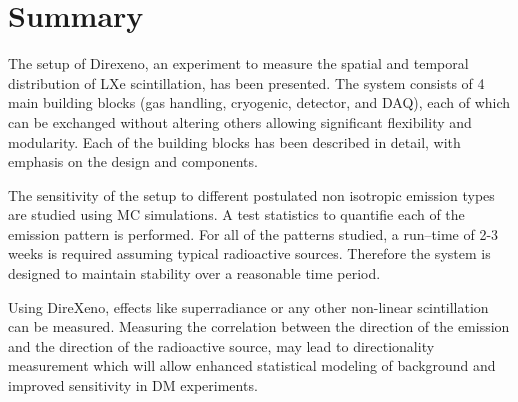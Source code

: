 \section{Summary}
\label{sec:summary}

%
%

The setup of Direxeno, an experiment to measure the spatial and temporal distribution of LXe scintillation, has 
been presented. The system consists of 4 main building blocks (gas handling, cryogenic, detector, 
and DAQ), each of which can be exchanged without altering others allowing significant flexibility 
and modularity. Each of the building blocks has been described in detail, with emphasis on the design 
and components.

The sensitivity of the setup to different postulated non isotropic emission types are studied using MC simulations. A test statistics to quantifie each of the emission pattern is performed. 
For all of the patterns studied, a run--time of 2-3 weeks is required assuming typical radioactive 
sources. Therefore the system is designed to maintain stability over a reasonable time period.

Using DireXeno, effects like superradiance or any other non-linear scintillation can be measured. 
Measuring the correlation between the direction of the emission and the direction of the radioactive 
source, may lead to directionality measurement which will allow enhanced statistical modeling of 
background and improved sensitivity in DM experiments.
